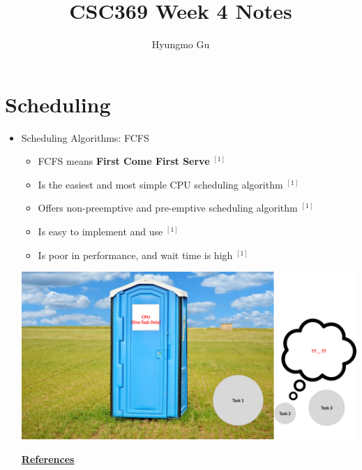 \documentclass[12pt]{article}
\begin{document}
\title{CSC369 Week 4 Notes}
\author{Hyungmo Gu}
\maketitle

\bigskip

\section{Scheduling}


\begin{itemize}
    \item Scheduling Algorithms: FCFS
    \begin{itemize}
        \item FCFS means \textbf{First Come First Serve} $^{[1]}$
        \item Is the easiest and most simple CPU scheduling algorithm $^{[1]}$
        \item Offers non-preemptive and pre-emptive scheduling algorithm $^{[1]}$
        \item Is easy to implement and use $^{[1]}$
        \item Is poor in performance, and wait time is high $^{[1]}$
    \end{itemize}

    \bigskip

    \begin{center}
    \includegraphics[width=0.8\linewidth]{../images/week_4_notes_1_1.png}
    \end{center}

    \underline{\textbf{References}}


\end{itemize}
\end{document}
